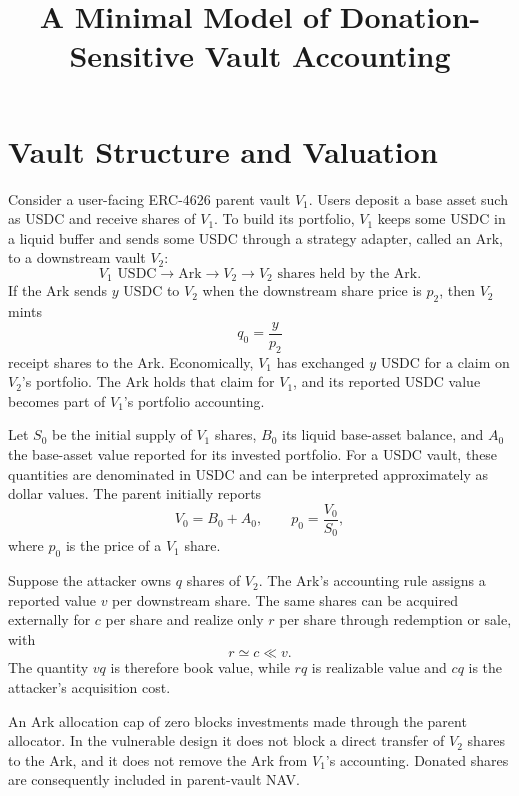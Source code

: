 \documentclass[11pt]{article}
\title{A Minimal Model of Donation-Sensitive Vault Accounting}
\author{}
\date{}
\begin{document}
\maketitle

\section{Vault Structure and Valuation}

Consider a user-facing ERC-4626 parent vault $V_1$.  Users deposit a base asset such as USDC and receive shares of $V_1$.  To build its portfolio, $V_1$ keeps some USDC in a liquid buffer and sends some USDC through a strategy adapter, called an Ark, to a downstream vault $V_2$:
\begin{equation}
    V_1\text{ USDC}
    \longrightarrow \text{Ark}
    \longrightarrow V_2
    \longrightarrow V_2\text{ shares held by the Ark}.
\end{equation}
If the Ark sends $y$ USDC to $V_2$ when the downstream share price is $p_2$, then $V_2$ mints
\begin{equation}
    q_0 = \frac{y}{p_2}
\end{equation}
receipt shares to the Ark.  Economically, $V_1$ has exchanged $y$ USDC for a claim on $V_2$'s portfolio.  The Ark holds that claim for $V_1$, and its reported USDC value becomes part of $V_1$'s portfolio accounting.

Let $S_0$ be the initial supply of $V_1$ shares, $B_0$ its liquid base-asset balance, and $A_0$ the base-asset value reported for its invested portfolio.  For a USDC vault, these quantities are denominated in USDC and can be interpreted approximately as dollar values.  The parent initially reports
\begin{equation}
    V_0 = B_0 + A_0,
    \qquad
    p_0 = \frac{V_0}{S_0},
\end{equation}
where $p_0$ is the price of a $V_1$ share.

Suppose the attacker owns $q$ shares of $V_2$.  The Ark's accounting rule assigns a reported value $v$ per downstream share.  The same shares can be acquired externally for $c$ per share and realize only $r$ per share through redemption or sale, with
\begin{equation}
    r \simeq c \ll v.
\end{equation}
The quantity $vq$ is therefore book value, while $rq$ is realizable value and $cq$ is the attacker's acquisition cost.

An Ark allocation cap of zero blocks investments made through the parent allocator.  In the vulnerable design it does not block a direct transfer of $V_2$ shares to the Ark, and it does not remove the Ark from $V_1$'s accounting.  Donated shares are consequently included in parent-vault NAV.
\end{document}

